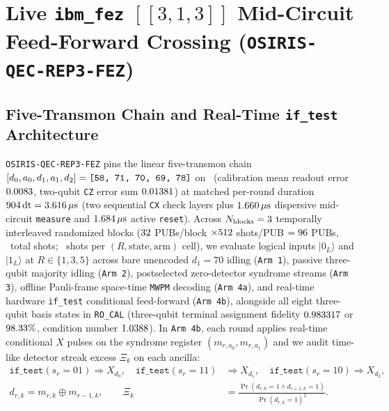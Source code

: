 \documentclass[aps,prx,twocolumn,superscriptaddress,nofootinbib]{revtex4-2}
\begin{document}
\section{Live \texttt{ibm\_fez} $[[3,1,3]]$ Mid-Circuit Feed-Forward Crossing (\texttt{OSIRIS-QEC-REP3-FEZ})}

\subsection{Five-Transmon Chain and Real-Time \texttt{if\_test} Architecture}
\texttt{OSIRIS-QEC-REP3-FEZ} pins the linear five-transmon chain $[d_0, a_0, d_1, a_1, d_2] = \texttt{[58, 71, 70, 69, 78]}$ on \remBackend\ (calibration mean readout error $0.0083$, two-qubit \texttt{CZ} error sum $0.01381$) at matched per-round duration $904\,\mathrm{dt} = 3.616\,\mu\mathrm{s}$ (two sequential \texttt{CX} check layers plus $1.660\,\mu\mathrm{s}$ dispersive mid-circuit \texttt{measure} and $1.684\,\mu\mathrm{s}$ active \texttt{reset}). Across $N_{\mathrm{blocks}} = 3$ temporally interleaved randomized blocks ($32$ PUBs/block $\times 512$ shots/PUB $= 96$ PUBs, \remRepTotalShots\ total shots; \remRepShotsPerCell\ shots per $(R, \text{state}, \text{arm})$ cell), we evaluate logical inputs $|0_L\rangle$ and $|1_L\rangle$ at $R \in \{1, 3, 5\}$ across bare unencoded $d_1 = 70$ idling (\texttt{Arm 1}), passive three-qubit majority idling (\texttt{Arm 2}), postselected zero-detector syndrome streams (\texttt{Arm 3}), offline Pauli-frame space-time \texttt{MWPM} decoding (\texttt{Arm 4a}), and real-time hardware \texttt{if\_test} conditional feed-forward (\texttt{Arm 4b}), alongside all eight three-qubit basis states in \texttt{RO\_CAL} (three-qubit terminal assignment fidelity $0.983317$ or $98.33\%$, condition number $1.0388$). In \texttt{Arm 4b}, each round applies real-time conditional $X$ pulses on the syndrome register $(m_{r,a_0}, m_{r,a_1})$ and we audit time-like detector streak excess $\Xi_k$ on each ancilla:
\begin{align}
  \texttt{if\_test}(s_r = 01) \Rightarrow X_{d_0}, \quad
  \texttt{if\_test}(s_r = 11) &\Rightarrow X_{d_1}, \quad
  \texttt{if\_test}(s_r = 10) \Rightarrow X_{d_2}, \nonumber\\
  d_{r,k} = m_{r,k} \oplus m_{r-1,k}, \qquad
  \Xi_k &= \frac{\Pr(d_{r,k}=1 \land d_{r+1,k}=1)}{\Pr(d_{r,k}=1)^2}.
  \label{eq:rep3_feedforward_streaks}
\end{align}
\end{document}
